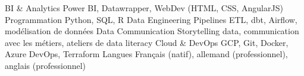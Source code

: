 \begin{cvskills}
  \cvskill
    {BI \& Analytics}
    {Power BI, Datawrapper, WebDev (HTML, CSS, AngularJS)}
  \cvskill
    {Programmation}
    {Python, SQL, R}
  \cvskill
    {Data Engineering}
    {Pipelines ETL, dbt, Airflow, modélisation de données}
  \cvskill
    {Data Communication}
    {Storytelling data, communication avec les métiers, ateliers de data literacy}
  \cvskill
    {Cloud \& DevOps}
    {GCP, Git, Docker, Azure DevOps, Terraform}
  \cvskill
    {Langues}
    {Français (natif), allemand (professionnel), anglais (professionnel)}
\end{cvskills}
